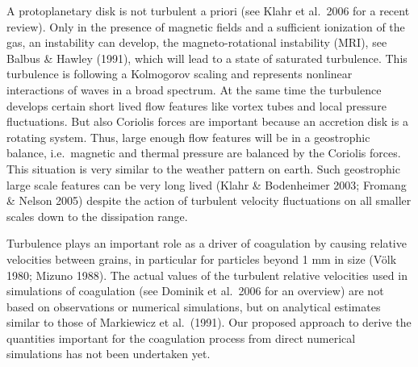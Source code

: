 A protoplanetary disk is not turbulent a priori (see Klahr et al.~2006 for a
recent review).  Only in the presence of magnetic fields and a sufficient
ionization of the gas, an instability can develop, the magneto-rotational
instability (MRI), see Balbus \& Hawley (1991), which will lead to a state
of saturated turbulence. This turbulence is following a Kolmogorov scaling
and represents nonlinear interactions of waves in a broad spectrum.  At the
same time the turbulence develops certain short lived flow features like
vortex tubes and local pressure fluctuations. But also Coriolis forces are
important because an accretion disk is a rotating system. Thus, large enough
flow features will be in a geostrophic balance, i.e.\ magnetic and thermal
pressure are balanced by the Coriolis forces. This situation is very similar
to the weather pattern on earth.  Such geostrophic large scale features can
be very long lived (Klahr \& Bodenheimer 2003; Fromang \& Nelson 2005)
despite the action of turbulent velocity fluctuations on all smaller scales
down to the dissipation range.

Turbulence plays an important role as a driver of coagulation by causing
relative velocities between grains, in particular for particles beyond 1 mm
in size (V\"olk 1980; Mizuno 1988). The actual values of the turbulent
relative velocities used in simulations of coagulation (see Dominik et al.\
2006 for an overview) are not based on observations or numerical
simulations, but on analytical estimates similar to those of Markiewicz et
al.\ (1991). Our proposed approach to derive the quantities important for
the coagulation process from direct numerical simulations has not been
undertaken yet.
%
